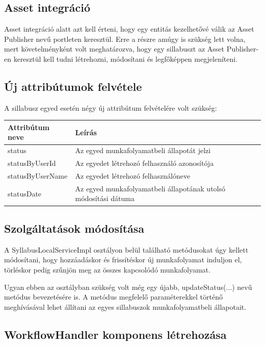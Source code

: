 \documentclass[hidelinks, 12pt, a4paper]{report}
\begin{document}
\subsection{Asset integráció}

Asset integráció alatt azt kell érteni, hogy egy entitás kezelhetővé válik az Asset Publisher nevű portleten keresztül. Erre a részre amúgy is szükség lett volna, mert követelményként volt meghatározva, hogy egy sillabuszt az Asset Publisher-en keresztül kell tudni létrehozni, módosítani és legfőképpen megjeleníteni.

\subsection{Új attribútumok felvétele}

A sillabusz egyed esetén négy új attribútum felvételére volt szükség:
\begin{table}[H]
	\centering
	\begin{tabular}{| l | l | l |}
	\hline
	\textbf{Attribútum neve} & \textbf{Leírás} \\
	\hline
	status & Az egyed munkafolyamatbeli állapotát jelzi \\
	\hline
	statusByUserId & Az egyedet létrehozó felhasználó azonosítója \\
	\hline
	statusByUserName & Az egyedet létrehozó felhasználóneve \\
	\hline
	statusDate & Az egyed munkafolyamatbeli állapotának utolsó módosítási dátuma \\
	\hline
\end{tabular}
\end{table}

\subsection{Szolgáltatások módosítása}

A SyllabusLocalServiceImpl osztályon belül található metódusokat úgy kellett módosítani, hogy hozzáadáskor és frissítéskor új munkafolyamat induljon el, törléskor pedig szűnjön meg az összes kapcsolódó munkafolyamat.

Ugyan ebben az osztályban szükség volt még egy újabb, updateStatus(...) nevű metódus bevezetésére is. A metódus megfelelő paraméterekkel történő meghívásával lehet állítani az egyes sillabuszok munkafolyamatbeli állapotait.

\subsection{WorkflowHandler komponens létrehozása}
\end{document}
